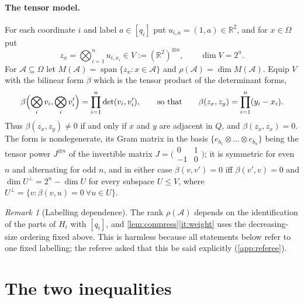 \documentclass[11pt,a4paper]{article}
\theoremstyle{plain}
\theoremstyle{definition}
\theoremstyle{remark}
\newtheorem{remark}[theorem]{Remark}
\newcommand{\R}{\mathbb R}
\newcommand{\cA}{\mathcal A}
\newcommand{\Om}{\Omega}
\newcommand{\rk}{\rho}
\newcommand{\spn}{\operatorname{span}}
\begin{document}
\paragraph{The tensor model.}
For each coordinate $i$ and label $a\in[q_i]$ put $u_{i,a}=(1,a)\in\R^2$, and for $x\in\Om$ put
\[
z_x=\bigotimes_{i=1}^nu_{i,x_i}\in V:=(\R^2)^{\otimes n},\qquad \dim V=2^n .
\]
For $\cA\subseteq\Om$ let $M(\cA)=\spn\{z_x:x\in\cA\}$ and $\rk(\cA)=\dim M(\cA)$. Equip $V$ with the bilinear form $\beta$ which is the tensor product of the determinant forms,
\[
\beta\Bigl(\bigotimes_iv_i,\bigotimes_iv_i'\Bigr)=\prod_{i=1}^n\det(v_i,v_i'),
\qquad\text{so that}\qquad
\beta(z_x,z_y)=\prod_{i=1}^n(y_i-x_i).
\]
Thus $\beta(z_x,z_y)\ne0$ if and only if $x$ and $y$ are adjacent in $Q$, and $\beta(z_x,z_x)=0$. The form is nondegenerate, its Gram matrix in the basis $\{e_{b_1}\otimes\dots\otimes e_{b_n}\}$ being the tensor power $J^{\otimes n}$ of the invertible matrix $J=\bigl(\begin{smallmatrix}0&1\\-1&0\end{smallmatrix}\bigr)$; it is symmetric for even $n$ and alternating for odd $n$, and in either case $\beta(v,v')=0$ iff $\beta(v',v)=0$ and $\dim U^\perp=2^n-\dim U$ for every subspace $U\le V$, where $U^\perp=\{v:\beta(v,u)=0\ \forall u\in U\}$.

\begin{remark}[Labelling dependence]\label{rem:labelling}
The rank $\rk(\cA)$ depends on the identification of the parts of $H_i$ with $[q_i]$, and \cref{lem:compress}\ref{it:weight} uses the decreasing-size ordering fixed above. This is harmless because all statements below refer to one fixed labelling; the referee asked that this be said explicitly (\cref{app:referee}).
\end{remark}

\section{The two inequalities}
\end{document}
